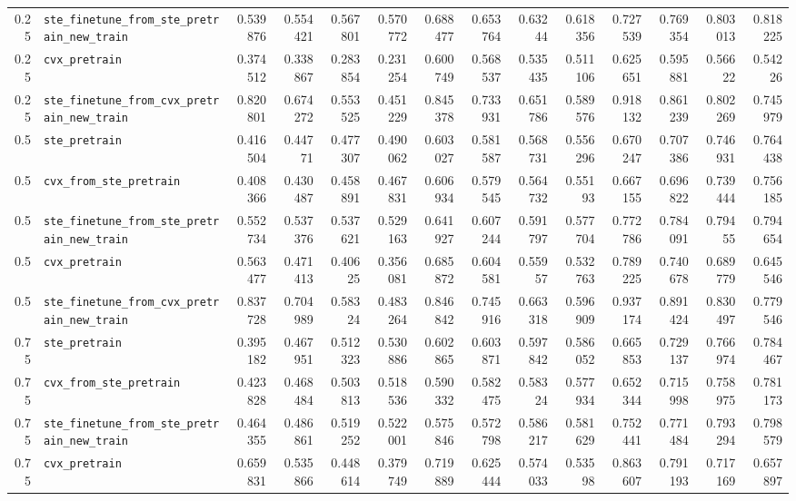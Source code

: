 \begin{longtable}{@{}r l *{12}{r}@{}}
0.25 & \texttt{ste\_finetune\_from\_ste\_pretrain\_new\_train} & 0.539876 & 0.554421 & 0.567801 & 0.570772 & 0.688477 & 0.653764 & 0.63244 & 0.618356 & 0.727539 & 0.769354 & 0.803013 & 0.818225 \\
0.25 & \texttt{cvx\_pretrain} & 0.374512 & 0.338867 & 0.283854 & 0.231254 & 0.600749 & 0.568537 & 0.535435 & 0.511106 & 0.625651 & 0.595881 & 0.56622 & 0.54226 \\
0.25 & \texttt{ste\_finetune\_from\_cvx\_pretrain\_new\_train} & 0.820801 & 0.674272 & 0.553525 & 0.451229 & 0.845378 & 0.733931 & 0.651786 & 0.589576 & 0.918132 & 0.861239 & 0.802269 & 0.745979 \\
0.5 & \texttt{ste\_pretrain} & 0.416504 & 0.44771 & 0.477307 & 0.490062 & 0.603027 & 0.581587 & 0.568731 & 0.556296 & 0.670247 & 0.707386 & 0.746931 & 0.764438 \\
0.5 & \texttt{cvx\_from\_ste\_pretrain} & 0.408366 & 0.430487 & 0.458891 & 0.467831 & 0.606934 & 0.579545 & 0.564732 & 0.55193 & 0.667155 & 0.696822 & 0.739444 & 0.756185 \\
0.5 & \texttt{ste\_finetune\_from\_ste\_pretrain\_new\_train} & 0.552734 & 0.537376 & 0.537621 & 0.529163 & 0.641927 & 0.607244 & 0.591797 & 0.577704 & 0.772786 & 0.784091 & 0.79455 & 0.794654 \\
0.5 & \texttt{cvx\_pretrain} & 0.563477 & 0.471413 & 0.40625 & 0.356081 & 0.685872 & 0.604581 & 0.55957 & 0.532763 & 0.789225 & 0.740678 & 0.689779 & 0.645546 \\
0.5 & \texttt{ste\_finetune\_from\_cvx\_pretrain\_new\_train} & 0.837728 & 0.704989 & 0.58324 & 0.483264 & 0.846842 & 0.745916 & 0.663318 & 0.596909 & 0.937174 & 0.891424 & 0.830497 & 0.779546 \\
0.75 & \texttt{ste\_pretrain} & 0.395182 & 0.467951 & 0.512323 & 0.530886 & 0.602865 & 0.603871 & 0.597842 & 0.586052 & 0.665853 & 0.729137 & 0.766974 & 0.784467 \\
0.75 & \texttt{cvx\_from\_ste\_pretrain} & 0.423828 & 0.468484 & 0.503813 & 0.518536 & 0.590332 & 0.582475 & 0.58324 & 0.577934 & 0.652344 & 0.715998 & 0.758975 & 0.781173 \\
0.75 & \texttt{ste\_finetune\_from\_ste\_pretrain\_new\_train} & 0.464355 & 0.486861 & 0.519252 & 0.522001 & 0.575846 & 0.572798 & 0.586217 & 0.581629 & 0.752441 & 0.771484 & 0.793294 & 0.798579 \\
0.75 & \texttt{cvx\_pretrain} & 0.659831 & 0.535866 & 0.448614 & 0.379749 & 0.719889 & 0.625444 & 0.574033 & 0.53598 & 0.863607 & 0.791193 & 0.717169 & 0.657897 \\

\end{longtable}
